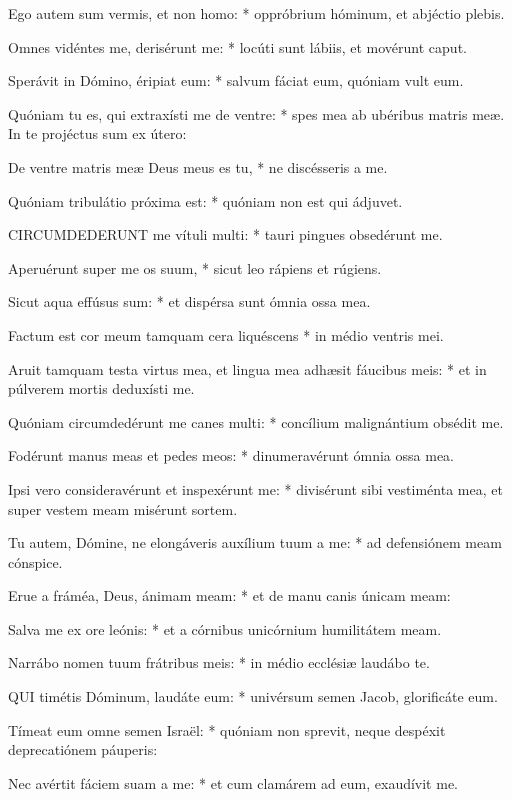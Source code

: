 Ego autem sum vermis, et non homo: * oppróbrium hóminum, et abjéctio plebis.

Omnes vidéntes me, derisérunt me: * locúti sunt lábiis, et movérunt caput.

Sperávit in Dómino, éripiat eum: * salvum fáciat eum, quóniam vult eum.

Quóniam tu es, qui extraxísti me de ventre: * spes mea ab ubéribus matris meæ. In te projéctus sum ex útero:

De ventre matris meæ Deus meus es tu, * ne discésseris a me.

Quóniam tribulátio próxima est: * quóniam non est qui ádjuvet.


\lettrine[lines=2]{C}{IRCUMDEDERUNT} me vítuli multi: * tauri pingues obsedérunt me.

Aperuérunt super me os suum, * sicut leo rápiens et rúgiens.

Sicut aqua effúsus sum: * et dispérsa sunt ómnia ossa mea.

Factum est cor meum tamquam cera liquéscens * in médio ventris mei.

Aruit tamquam testa virtus mea, et lingua mea adhæsit fáucibus meis: * et in púlverem mortis deduxísti me.

Quóniam circumdedérunt me canes multi: * concílium malignántium obsédit me.

Fodérunt manus meas et pedes meos: * dinumeravérunt ómnia ossa mea.

Ipsi vero consideravérunt et inspexérunt me: * divisérunt sibi vestiménta mea, et super vestem meam misérunt sortem.

Tu autem, Dómine, ne elongáveris auxílium tuum a me: * ad defensiónem meam cónspice.

Erue a fráméa, Deus, ánimam meam: * et de manu canis únicam meam:

Salva me ex ore leónis: * et a córnibus unicórnium humilitátem meam.

Narrábo nomen tuum frátribus meis: * in médio ecclésiæ laudábo te.


\lettrine[lines=2]{Q}{UI} timétis Dóminum, laudáte eum: * univérsum semen Jacob, glorificáte eum.

Tímeat eum omne semen Israël: * quóniam non sprevit, neque despéxit deprecatiónem páuperis:

Nec avértit fáciem suam a me: * et cum clamárem ad eum, exaudívit me.

